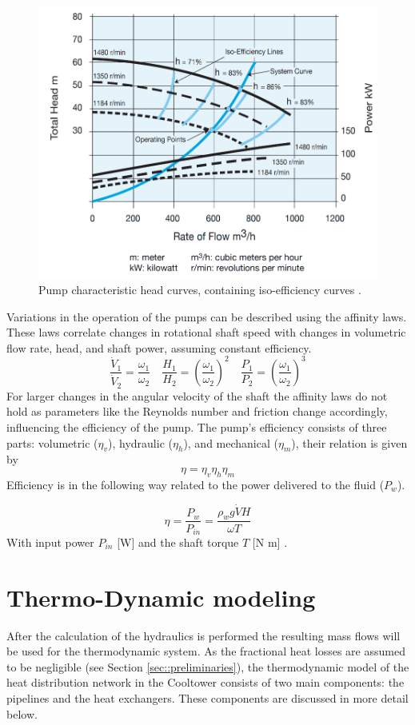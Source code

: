 \begin{figure}[h!]
    \centering
    \includegraphics[width=0.6\linewidth]{Literature Survey - DCSC template/figuresLIT/pumpgoed.png}
    \caption{Pump characteristic head curves, containing iso-efficiency curves \cite{pumpcharacteristics}.}
    \label{fig::pumpcharacteristic}
\end{figure}

Variations in the operation of the pumps can be described using the affinity laws. These laws correlate changes in rotational shaft speed with changes in volumetric flow rate, head, and shaft power, assuming constant efficiency. 
\begin{equation}
\frac{\dot{V}_1}{\dot{V}_2}=\frac{\omega_1}{\omega_2} \quad \frac{H_1}{H_2}=\left(\frac{\omega_1}{\omega_2}\right)^2 \quad \frac{P_1}{P_2}=\left(\frac{\omega_1}{\omega_2}\right)^3
\end{equation}
For larger changes in the angular velocity of the shaft the affinity laws do not hold as parameters like the Reynolds number and friction change accordingly, influencing the efficiency of the pump. 
The pump's efficiency consists of three parts: volumetric ($\eta_v$), hydraulic ($\eta_h$), and mechanical ($\eta_m$), their relation is given by
\begin{equation}\label{eq::effpump}
    \eta = \eta_v\eta_h\eta_m
\end{equation}
Efficiency is in the following way related to the power delivered to the fluid ($P_w$).

\begin{equation}\label{eq::}
    \eta = \frac{P_w}{P_{in}} = \frac{\rho_w g \dot{V} H}{\omega T}
\end{equation}
With input power $P_{in}$ [W] and the shaft torque $T$ [N m] \cite{white2011fluid}. 

\section{Thermo-Dynamic modeling}\label{sec::thermo}
After the calculation of the hydraulics is performed the resulting mass flows will be used for the thermodynamic system. As the fractional heat losses are assumed to be negligible (see Section \ref{sec::preliminaries}), the thermodynamic model of the heat distribution network in the Cooltower consists of two main components: the pipelines and the heat exchangers. These components are discussed in more detail below. 

